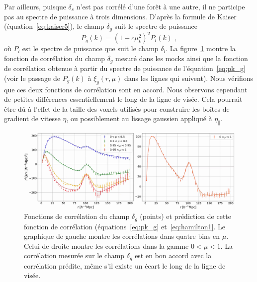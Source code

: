 Par ailleurs, puisque $\delta_s$ n'est pas corrélé d'une forêt à une autre, il ne participe pas au spectre de puissance à trois dimensions.
D'après la formule de Kaiser (équation~\ref{eq:kaiser5}), le champ $\delta_g$ suit le spectre de puissance
\begin{equation}
  \label{eq:pk_g}
    P_g(k) = (1 + c \mu_k^2)^2 P_l(k) \; ,
  \end{equation}
  où $P_l$ est le spectre de puissance que suit le champ $\delta_l$.
  La figure~\ref{fig:xi_g} montre la fonction de corrélation du champ $\delta_g$ mesuré dans les mocks ainsi que la fonction de corrélation obtenue à partir du spectre de puissance de l'équation~\ref{eq:pk_g} (voir le passage de $P_g(k)$ à $\xi_g(r,\mu)$ dans les lignes qui suivent). Nous vérifions que ces deux fonctions de corrélation sont en accord.
Nous observons cependant de petites différences essentiellement le long de la ligne de visée.
  Cela pourrait être dû à l'effet de la taille des voxels utilisés pour construire les boîtes de gradient de vitesse $\eta$, ou possiblement au lissage gaussien appliqué à $\eta_{\parallel}$.
  \begin{figure}
    \centering
    \includegraphics[scale=0.4]{xi_g}
    \caption{Fonctions de corrélation du champ $\delta_g$ (points) et prédiction de cette fonction de corrélation (équations~\ref{eq:pk_g} et~\ref{eq:hamilton1}. Le graphique de gauche montre les corrélations dans quatre bins en $\mu$. Celui de droite montre les corrélations dans la gamme $0 < \mu < 1$. La corrélation mesurée sur le champ $\delta_g$ est en bon accord avec la corrélation prédite, même s'il existe un écart le long de la ligne de visée.}
    \label{fig:xi_g}
  \end{figure}


